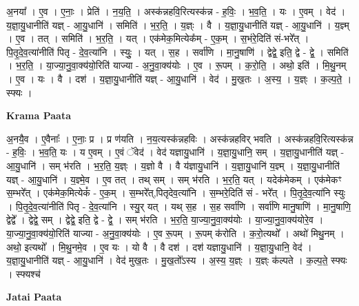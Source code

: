 \documentclass[17pt]{extarticle}
\begin{document}
अ॒नया᳚ । ए॒व । ए॒नाः॒ । प्रेति॑ । न॒य॒ति॒ । अस्क॑न्नहवि॒रित्यस्क॑न्न - ह॒विः॒ । भ॒व॒ति॒ । यः । ए॒वम् । वेद॑ । य॒ज्ञा॒यु॒धानीति॑ यज्ञ् - आ॒यु॒धानि॑ । समिति॑ । भ॒र॒ति॒ । य॒ज्ञ्ः । वै । य॒ज्ञा॒यु॒धानीति॑ यज्ञ् - आ॒यु॒धानि॑ । य॒ज्ञ्म् । ए॒व । तत् । समिति॑ । भ॒र॒ति॒ । यत् । एक॑मेक॒मित्येक᳚म् - ए॒क॒म् । स॒भंरे॒दिति॑ सं-भरे᳚त् । पि॒तृ॒दे॒व॒त्या॑नीति॑ पितृ - दे॒व॒त्या॑नि । स्युः॒ । यत् । स॒ह । सर्वा॑णि । मा॒नु॒षाणि॑ । द्वेद्वे॒ इति॒ द्वे - द्वे॒ । समिति॑ । भ॒र॒ति॒ । या॒ज्या॒नु॒वा॒क्य॑यो॒रिति॑ याज्या - अ॒नु॒वा॒क्य॑योः । ए॒व । रू॒पम् । क॒रो॒ति॒ । अथो॒ इति॑ । मि॒थु॒नम् । ए॒व । यः । वै । दश॑ । य॒ज्ञा॒यु॒धानीति॑ यज्ञ् - आ॒यु॒धानि॑ । वेद॑ । मु॒ख॒तः । अ॒स्य॒ । य॒ज्ञ्ः । क॒ल्प॒ते॒ । स्फ्यः ।  \newline


\textbf{Krama Paata} \newline

अ॒नयै॒व । ए॒वैनाः᳚ । ए॒नाः॒ प्र । प्र ण॑यति । न॒य॒त्यस्क॑न्नहविः । अस्क॑न्नहविर् भवति । अस्क॑न्नहवि॒रित्यस्क॑न्न - ह॒विः॒ । भ॒व॒ति॒ यः । य ए॒वम् । ए॒वं ॅवेद॑ । वेद॑ यज्ञायु॒धानि॑ । य॒ज्ञा॒यु॒धानि॒ सम् । य॒ज्ञा॒यु॒धानीति॑ यज्ञ् - आ॒यु॒धानि॑ । सम् भ॑रति । भ॒र॒ति॒ य॒ज्ञ्ः । य॒ज्ञो वै । वै य॑ज्ञायु॒धानि॑ । य॒ज्ञा॒यु॒धानि॑ य॒ज्ञ्म् । य॒ज्ञा॒यु॒धानीति॑ यज्ञ् - आ॒यु॒धानि॑ । य॒ज्ञ्मे॒व । ए॒व तत् । तथ् सम् । सम् भ॑रति । भ॒र॒ति॒ यत् । यदेक॑मेकम् । एक॑मेकꣳ स॒म्भरे᳚त् । एक॑मेक॒मित्येकं᳚ - ए॒क॒म् । स॒म्भरे᳚त्,पितृदेव॒त्या॑नि । स॒म्भरे॒दिति॑ सं - भरे᳚त् । पि॒तृ॒दे॒व॒त्या॑नि स्युः । पि॒तृ॒दे॒व॒त्या॑नीति॑ पितृ - दे॒व॒त्या॑नि । स्यु॒र् यत् । यथ् स॒ह । स॒ह सर्वा॑णि । सर्वा॑णि मानु॒षाणि॑ । मा॒नु॒षाणि॒ द्वेद्वे᳚ । द्वेद्वे॒ सम् । द्वेद्वे॒ इति॒ द्वे - द्वे॒ । सम् भ॑रति । भ॒र॒ति॒ या॒ज्या॒नु॒वा॒क्य॑योः । या॒ज्या॒नु॒वा॒क्य॑योरे॒व । या॒ज्या॒नु॒वा॒क्य॑यो॒रिति॑ याज्या - अ॒नु॒वा॒क्य॑योः । ए॒व रू॒पम् । रू॒पम् क॑रोति । क॒रो॒त्यथो᳚ । अथो॑ मिथु॒नम् । अथो॒ इत्यथो᳚ । मि॒थु॒नमे॒व । ए॒व यः । यो वै । वै दश॑ । दश॑ यज्ञायु॒धानि॑ । य॒ज्ञा॒यु॒धानि॒ वेद॑ । य॒ज्ञा॒यु॒धानीति॑ यज्ञ् - आ॒यु॒धानि॑ । वेद॑ मुख॒तः । मु॒ख॒तो᳚ऽस्य । अ॒स्य॒ य॒ज्ञ्ः । य॒ज्ञ्ः क॑ल्पते । क॒ल्प॒ते॒ स्फ्यः । स्फ्यश्च॑ \newline

\textbf{Jatai Paata} \newline
\end{document}
